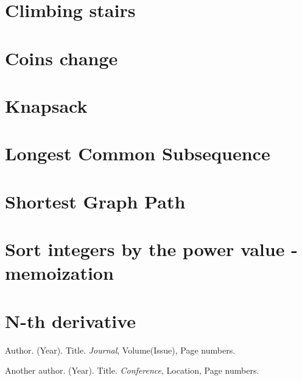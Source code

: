 \documentclass{article}
\begin{document}
\section{Climbing stairs}

\section{Coins change}

\section{Knapsack}

\section{Longest Common Subsequence}

\section{Shortest Graph Path}

\section{Sort integers by the power value - memoization}

\section{N-th derivative}

\begin{thebibliography}{9}
Author. (Year). Title. \textit{Journal}, Volume(Issue), Page numbers.

Another author. (Year). Title. \textit{Conference}, Location, Page numbers.

\end{thebibliography}
\end{document}
